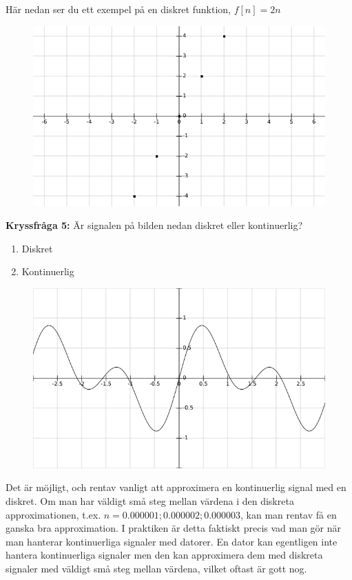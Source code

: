 \documentclass{article}
\begin{document}
Här nedan ser du ett exempel på en diskret funktion, $f[n]=2 n$
\begin{figure}[ht]
\centerline{\includegraphics[scale=0.55]{image10.png}}
\caption{}
\label{}
\end{figure}
\newpage

\textbf{Kryssfråga 5:} Är signalen på bilden nedan diskret eller kontinuerlig?
\begin{enumerate}[label={\alph*)},font={\bfseries}]
\item Diskret
\item Kontinuerlig
\end{enumerate}

\begin{figure}[ht]
\centerline{\includegraphics[scale=0.55]{image13.png}}
\caption{}
\label{}
\end{figure}

Det är möjligt, och rentav vanligt att approximera en kontinuerlig signal
med en diskret. Om man har väldigt små steg mellan värdena i den diskreta
approximationen, t.ex. $n={0.000001 ; 0.000002 ; 0.000003}$, kan man rentav få
en ganska bra approximation. I praktiken är detta faktiskt precis vad man gör när
man hanterar kontinuerliga signaler med datorer. En dator kan egentligen inte
hantera kontinuerliga signaler men den kan approximera dem med diskreta signaler
med väldigt små steg mellan värdena, vilket oftast är gott nog.
\end{document}
